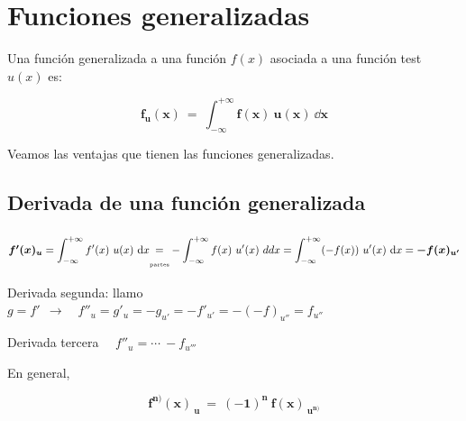 \vspace{10mm}
\section{Funciones generalizadas}

\begin{definition}

Una función generalizada a una función $f(x)$ 	asociada a una función test $u(x)$ es:

\begin{large}
\begin{equation}
\label{T36FG}
\boldsymbol{
f_u(x) \ = \ \int_{-\infty}^{+\infty} f(x)\ u(x)\ \dd x 
}	
\end{equation}
\end{large}
\end{definition}

Veamos las ventajas que tienen las funciones generalizadas.

\vspace{0.5cm}
\subsection{Derivada de una función generalizada}
\vspace{0.5cm}


$\boldsymbol{ f'(x)_u }= \displaystyle \int_{-\infty}^{+\infty} f'(x) \ u(x)\ \dd x 
\begin{matrix} \\ = \\ \text{\tiny{partes}} \end{matrix}
-\int_{-\infty}^{+\infty} f(x)\ u'(x)\ dd x = \int_{-\infty}^{+\infty} (-f(x))\ u'(x)\ \dd x = \boldsymbol{-f(x)_{u'}}$

Derivada segunda: llamo $g=f' \ \  \to \quad f''_u=g'_u=-g_{u'}=-f'_{u'}=-(-f)_{u''}=f_{u''}$

Derivada tercera $\quad f''_u=\cdots \ -f_{u'''}$

En general, 

\begin{equation}
\label{T36DFG}
\boldsymbol{
f^{n)}(x)_{\ u} \ = \ (-1)^n\ f(x)_{\ u^{n)}}
}	
\end{equation}

